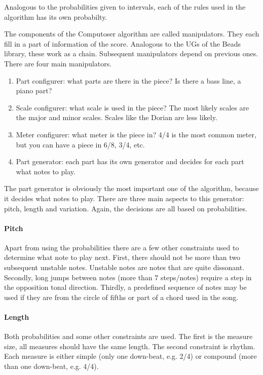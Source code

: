 \documentclass[12pt]{article}
\begin{document}
Analogous to the probabilities given to intervals, each of the rules used in the algorithm has its own probabilty.
\newline

The components of the Computoser algorithm are called manipulators. They each fill in a part of information of the score. Analogous to the UGs of the Beads library, these work as a chain. Subsequent manipulators depend on previous ones. There are four main manipulators.

\begin{enumerate}
\item Part configurer: what parts are there in the piece? Is there a bass line, a piano part?
\item Scale configurer: what scale is used in the piece? The most likely scales are the major and minor scales. Scales like the Dorian are less likely.
\item Meter configurer: what meter is the piece in? 4/4 is the most common meter, but you can have a piece in 6/8, 3/4, etc.
\item Part generator: each part has its own generator and decides for each part what notes to play.
\end{enumerate}
 
The part generator is obviously the most important one of the algorithm, because it decides what notes to play. There are three main aspects to this generator: pitch, length and variation. Again, the decisions are all based on probabilities.

\paragraph{Pitch} Apart from using the probabilities there are a few other constraints used to determine what note to play next. First, there should not be more than two subsequent unstable notes. Unstable notes are notes that are quite dissonant. Secondly, long jumps between notes (more than 7 steps/notes) require a step in the opposition tonal direction. Thirdly, a predefined sequence of notes may be used if they are from the circle of fifths or part of a chord used in the song.

\paragraph{Length} Both probabilities and some other constraints are used. The first is the measure size, all measures should have the same length. The second constraint is rhythm. Each measure is either simple (only one down-beat, e.g. 2/4) or compound (more than one down-beat, e.g. 4/4).
\end{document}
